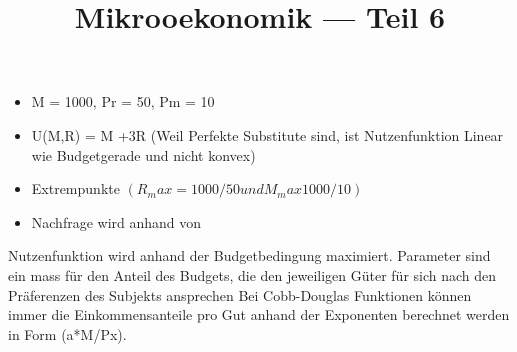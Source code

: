 \documentclass[a4paper]{article}
\title{\textbf{Mikrooekonomik — Teil 6}}
\begin{document}
    \maketitle
     
    \begin{itemize}
        \item M = 1000, Pr = 50, Pm = 10
        \item U(M,R) = M +3R (Weil Perfekte Substitute sind, ist Nutzenfunktion Linear wie Budgetgerade und nicht konvex)
        \item Extrempunkte $(R_max = 1000/50 und M_max 1000/10) $
    \end{itemize}
    \begin{itemize}
        \item Nachfrage wird anhand von 
    \end{itemize}
    
    Nutzenfunktion wird anhand der Budgetbedingung maximiert.
    Parameter sind ein mass für den Anteil des Budgets, die den jeweiligen Güter für sich nach den Präferenzen des Subjekts ansprechen
    Bei Cobb-Douglas Funktionen können immer die Einkommensanteile pro Gut anhand der Exponenten berechnet werden in Form (a*M/Px).

    
\end{document}
